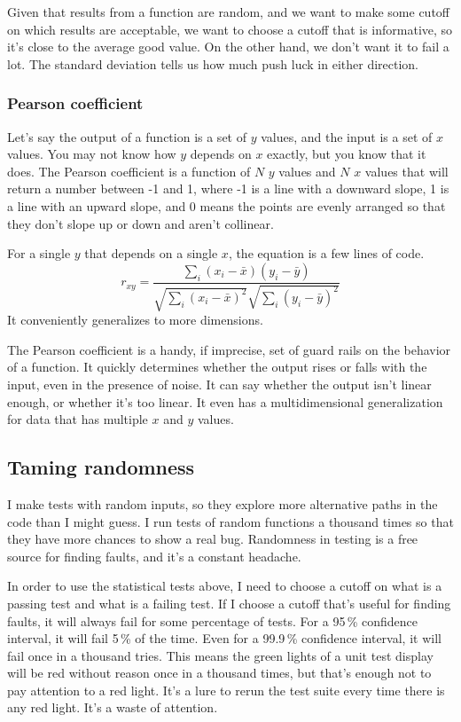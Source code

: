 \documentclass[fleqn,10pt]{olplainarticle}
\begin{document}
Given that results from a function are random, and we
want to make some cutoff on which results are acceptable,
we want to choose a cutoff that is informative, so it's
close to the average good value. On the other hand, we don't
want it to fail a lot. The standard deviation tells us
how much push luck in either direction.

\subsubsection{Pearson coefficient}
Let's say the output of a function is a set of $y$ values,
and the input is a set of $x$ values. You may not know
how $y$ depends on $x$ exactly, but you know that it
does. The Pearson coefficient is a function of
$N$ $y$ values and $N$ $x$ values that will return a number
between -1 and 1, where -1 is a line with a downward slope,
1 is a line with an upward slope, and 0 means the points
are evenly arranged so that they don't slope up or down
and aren't collinear.

For a single $y$ that depends on a single $x$, the equation
is a few lines of code.
\begin{equation}
r_{xy} = \frac{\sum_i (x_i - \bar{x})(y_i - \bar{y})}{\sqrt{\sum_i (x_i - \bar{x})^2}\sqrt{\sum_i(y_i - \bar{y})^2}}
\end{equation}
It conveniently generalizes to more dimensions.

The Pearson coefficient is a handy, if imprecise,
set of guard rails on the behavior of a function.
It quickly determines whether the output rises or falls with the input,
even in the presence of noise. It can say whether the output
isn't linear enough, or whether it's too linear.
It even has a multidimensional generalization for data that
has multiple $x$ and $y$ values.


\subsection{Taming randomness}

I make tests with random inputs, so they explore more alternative
paths in the code than I might guess. I run tests of random
functions a thousand times so that they have more chances to
show a real bug. Randomness in testing is a free source for
finding faults, and it's a constant headache.

In order to use the statistical tests above, I need to choose
a cutoff on what is a passing test and what is a failing test.
If I choose a cutoff that's useful for finding faults, it will
always fail for some percentage of tests. For a 95\,\% confidence
interval, it will fail 5\,\% of the time. Even for a
99.9\,\% confidence interval, it will fail once in a thousand
tries. This means the green lights of a unit test display will
be red without reason once in a thousand times, but that's
enough not to pay attention to a red light. It's a lure to
rerun the test suite every time there is any red light.
It's a waste of attention.
\end{document}
